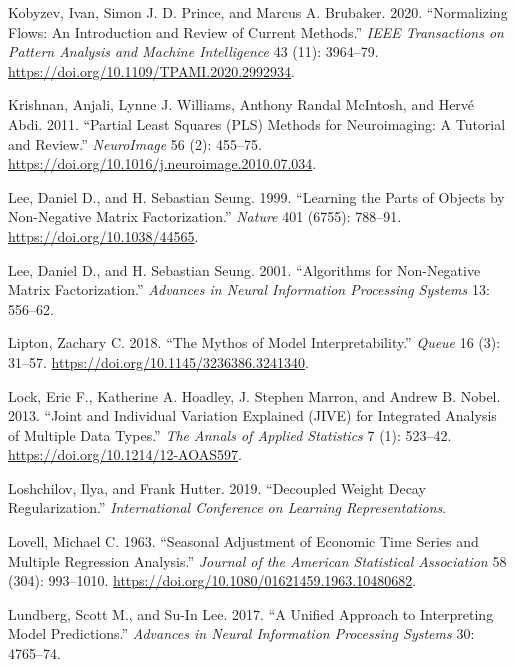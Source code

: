 \documentclass[
  10pt,
  letterpaper,
]{report}
\newlength{\cslhangindent}
\newenvironment{CSLReferences}[2] %
 {\begin{list}{}{%
  \setlength{\itemindent}{0pt}
  \setlength{\leftmargin}{0pt}
  \setlength{\parsep}{0pt}
  \ifodd #1
   \setlength{\leftmargin}{\cslhangindent}
   \setlength{\itemindent}{-1\cslhangindent}
  \fi
  \setlength{\itemsep}{#2\baselineskip}}}
 {\end{list}}
\begin{document}
\begin{CSLReferences}{1}{1}
Kobyzev, Ivan, Simon J. D. Prince, and Marcus A. Brubaker. 2020.
{``Normalizing Flows: An Introduction and Review of Current Methods.''}
\emph{IEEE Transactions on Pattern Analysis and Machine Intelligence} 43
(11): 3964--79. \url{https://doi.org/10.1109/TPAMI.2020.2992934}.

Krishnan, Anjali, Lynne J. Williams, Anthony Randal McIntosh, and Hervé
Abdi. 2011. {``Partial {Least Squares} ({PLS}) Methods for Neuroimaging:
A Tutorial and Review.''} \emph{NeuroImage} 56 (2): 455--75.
\url{https://doi.org/10.1016/j.neuroimage.2010.07.034}.

Lee, Daniel D., and H. Sebastian Seung. 1999. {``Learning the Parts of
Objects by Non-Negative Matrix Factorization.''} \emph{Nature} 401
(6755): 788--91. \url{https://doi.org/10.1038/44565}.

Lee, Daniel D., and H. Sebastian Seung. 2001. {``Algorithms for
Non-Negative Matrix Factorization.''} \emph{Advances in Neural
Information Processing Systems} 13: 556--62.

Lipton, Zachary C. 2018. {``The Mythos of Model Interpretability.''}
\emph{Queue} 16 (3): 31--57.
\url{https://doi.org/10.1145/3236386.3241340}.

Lock, Eric F., Katherine A. Hoadley, J. Stephen Marron, and Andrew B.
Nobel. 2013. {``Joint and Individual Variation Explained ({JIVE}) for
Integrated Analysis of Multiple Data Types.''} \emph{The Annals of
Applied Statistics} 7 (1): 523--42.
\url{https://doi.org/10.1214/12-AOAS597}.

Loshchilov, Ilya, and Frank Hutter. 2019. {``Decoupled Weight Decay
Regularization.''} \emph{International Conference on Learning
Representations}.

Lovell, Michael C. 1963. {``Seasonal Adjustment of Economic Time Series
and Multiple Regression Analysis.''} \emph{Journal of the American
Statistical Association} 58 (304): 993--1010.
\url{https://doi.org/10.1080/01621459.1963.10480682}.

Lundberg, Scott M., and Su-In Lee. 2017. {``A Unified Approach to
Interpreting Model Predictions.''} \emph{Advances in Neural Information
Processing Systems} 30: 4765--74.


\end{CSLReferences}
\end{document}
